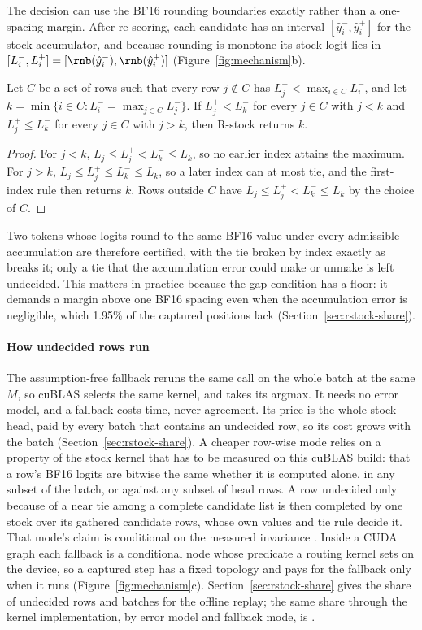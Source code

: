 The decision can use the BF16 rounding boundaries exactly rather than a one-spacing margin. After re-scoring, each candidate has an interval $[\hat y_i^-,\hat y_i^+]$ for the stock accumulator, and because rounding is monotone its stock logit lies in $[L_i^-,L_i^+]=[\rnb(\hat y_i^-),\rnb(\hat y_i^+)]$ (Figure~\ref{fig:mechanism}b).

\begin{proposition}\label{prop:stockinterval}
Let $C$ be a set of rows such that every row $j\notin C$ has $L_j^+<\max_{i\in C}L_i^-$, and let $k=\min\{i\in C:L_i^-=\max_{j\in C}L_j^-\}$. If $L_j^+<L_k^-$ for every $j\in C$ with $j<k$ and $L_j^+\le L_k^-$ for every $j\in C$ with $j>k$, then R-stock returns $k$.
\end{proposition}
\begin{proof}
For $j<k$, $L_j\le L_j^+<L_k^-\le L_k$, so no earlier index attains the maximum. For $j>k$, $L_j\le L_j^+\le L_k^-\le L_k$, so a later index can at most tie, and the first-index rule then returns $k$. Rows outside $C$ have $L_j\le L_j^+<L_k^-\le L_k$ by the choice of $C$.
\end{proof}
Two tokens whose logits round to the same BF16 value under every admissible accumulation are therefore certified, with the tie broken by index exactly as  breaks it; only a tie that the accumulation error could make or unmake is left undecided. This matters in practice because the gap condition has a floor: it demands a margin above one BF16 spacing even when the accumulation error is negligible, which 1.95\% of the captured positions lack (Section~\ref{sec:rstock-share}).

\paragraph{How undecided rows run} The assumption-free fallback reruns the same  call on the whole batch at the same $M$, so cuBLAS selects the same kernel, and takes its argmax. It needs no error model, and a fallback costs time, never agreement. Its price is the whole stock head, paid by every batch that contains an undecided row, so its cost grows with the batch (Section~\ref{sec:rstock-share}). A cheaper row-wise mode relies on a property of the stock kernel that has to be measured on this cuBLAS build: that a row's BF16 logits are bitwise the same whether it is computed alone, in any subset of the batch, or against any subset of head rows. A row undecided only because of a near tie among a complete candidate list is then completed by one stock  over its gathered candidate rows, whose own values and tie rule decide it. That mode's claim is conditional on the measured invariance . Inside a CUDA graph each fallback is a conditional node whose predicate a routing kernel sets on the device, so a captured step has a fixed topology and pays for the fallback only when it runs (Figure~\ref{fig:mechanism}c). Section~\ref{sec:rstock-share} gives the share of undecided rows and batches for the offline replay; the same share through the kernel implementation, by error model and fallback mode, is .

